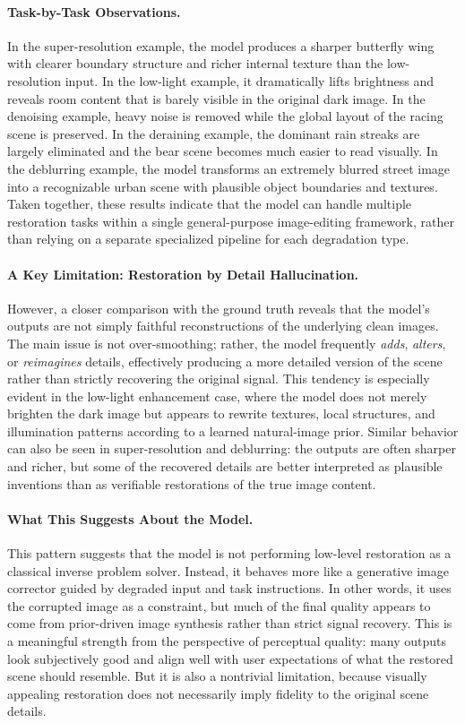 \documentclass{llmxive}
\begin{document}
\paragraph{Task-by-Task Observations.}
In the super-resolution example, the model produces a sharper butterfly wing with clearer boundary structure and richer internal texture than the low-resolution input. In the low-light example, it dramatically lifts brightness and reveals room content that is barely visible in the original dark image. In the denoising example, heavy noise is removed while the global layout of the racing scene is preserved. In the deraining example, the dominant rain streaks are largely eliminated and the bear scene becomes much easier to read visually. In the deblurring example, the model transforms an extremely blurred street image into a recognizable urban scene with plausible object boundaries and textures. Taken together, these results indicate that the model can handle multiple restoration tasks within a single general-purpose image-editing framework, rather than relying on a separate specialized pipeline for each degradation type.

\paragraph{A Key Limitation: Restoration by Detail Hallucination.}
However, a closer comparison with the ground truth reveals that the model's outputs are not simply faithful reconstructions of the underlying clean images. The main issue is not over-smoothing; rather, the model frequently \emph{adds}, \emph{alters}, or \emph{reimagines} details, effectively producing a more detailed version of the scene rather than strictly recovering the original signal. This tendency is especially evident in the low-light enhancement case, where the model does not merely brighten the dark image but appears to rewrite textures, local structures, and illumination patterns according to a learned natural-image prior. Similar behavior can also be seen in super-resolution and deblurring: the outputs are often sharper and richer, but some of the recovered details are better interpreted as plausible inventions than as verifiable restorations of the true image content.

\paragraph{What This Suggests About the Model.}
This pattern suggests that the model is not performing low-level restoration as a classical inverse problem solver. Instead, it behaves more like a generative image corrector guided by degraded input and task instructions. In other words, it uses the corrupted image as a constraint, but much of the final quality appears to come from prior-driven image synthesis rather than strict signal recovery. This is a meaningful strength from the perspective of perceptual quality: many outputs look subjectively good and align well with user expectations of what the restored scene should resemble. But it is also a nontrivial limitation, because visually appealing restoration does not necessarily imply fidelity to the original scene details.
\end{document}
